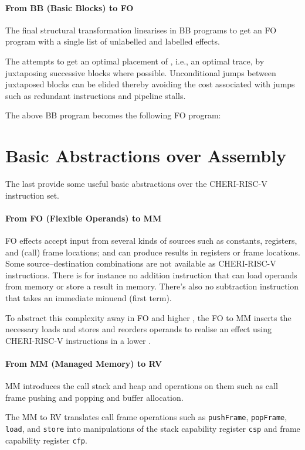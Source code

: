 \documentclass[main.tex]{subfiles}
\begin{document}
\paragraph{From BB (Basic Blocks) to FO} The final structural transformation linearises  in BB programs to get an FO program with a single list of unlabelled and labelled effects.

The  attempts to get an optimal placement of , i.e., an optimal trace, by juxtaposing successive blocks where possible. Unconditional jumps between juxtaposed blocks can be elided thereby avoiding the cost associated with jumps such as redundant instructions and pipeline stalls.

The above BB program becomes the following FO program:

\section{Basic Abstractions over Assembly} \label{sct:fo}
The last  provide some useful basic abstractions over the CHERI-RISC-V instruction set.

\paragraph{From FO (Flexible Operands) to MM} FO effects accept input from several kinds of sources such as constants, registers, and (call) frame locations; and can produce results in registers or frame locations. Some source–destination combinations are not available as CHERI-RISC-V instructions. There is for instance no addition instruction that can load operands from memory or store a result in memory. There's also no subtraction instruction that takes an immediate minuend (first term).

To abstract this complexity away in FO and higher , the FO to MM  inserts the necessary loads and stores and reorders operands to realise an effect using CHERI-RISC-V instructions in a lower .

\paragraph{From MM (Managed Memory) to RV} MM introduces the call stack and heap and operations on them such as call frame pushing and popping and buffer allocation.

The MM to RV  translates call frame operations such as \texttt{pushFrame}, \texttt{popFrame}, \texttt{load}, and \texttt{store} into manipulations of the stack capability register \texttt{csp} and frame capability register \texttt{cfp}.
\end{document}
